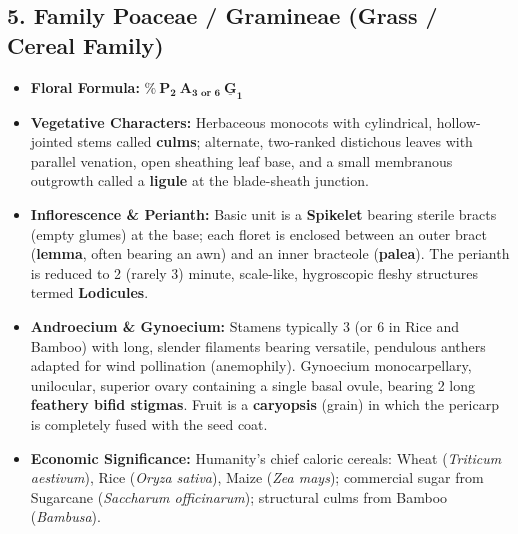 \documentclass[10pt,twoside,openright]{book}
\begin{document}
\subsection{5. Family Poaceae / Gramineae (Grass / Cereal Family)}
\begin{itemize}
  \item \textbf{Floral Formula:} $\mathbf{\%\:\text{P}_2\:\text{A}_{3 \text{ or } 6}\:\underline{\text{G}}_1}$
  \item \textbf{Vegetative Characters:} Herbaceous monocots with cylindrical, hollow-jointed stems called \textbf{culms}; alternate, two-ranked distichous leaves with parallel venation, open sheathing leaf base, and a small membranous outgrowth called a \textbf{ligule} at the blade-sheath junction.
  \item \textbf{Inflorescence \& Perianth:} Basic unit is a \textbf{Spikelet} bearing sterile bracts (empty glumes) at the base; each floret is enclosed between an outer bract (\textbf{lemma}, often bearing an awn) and an inner bracteole (\textbf{palea}). The perianth is reduced to 2 (rarely 3) minute, scale-like, hygroscopic fleshy structures termed \textbf{Lodicules}.
  \item \textbf{Androecium \& Gynoecium:} Stamens typically 3 (or 6 in Rice and Bamboo) with long, slender filaments bearing versatile, pendulous anthers adapted for wind pollination (anemophily). Gynoecium monocarpellary, unilocular, superior ovary containing a single basal ovule, bearing 2 long \textbf{feathery bifid stigmas}. Fruit is a \textbf{caryopsis} (grain) in which the pericarp is completely fused with the seed coat.
  \item \textbf{Economic Significance:} Humanity's chief caloric cereals: Wheat (\textit{Triticum aestivum}), Rice (\textit{Oryza sativa}), Maize (\textit{Zea mays}); commercial sugar from Sugarcane (\textit{Saccharum officinarum}); structural culms from Bamboo (\textit{Bambusa}).
\end{itemize}
\end{document}
